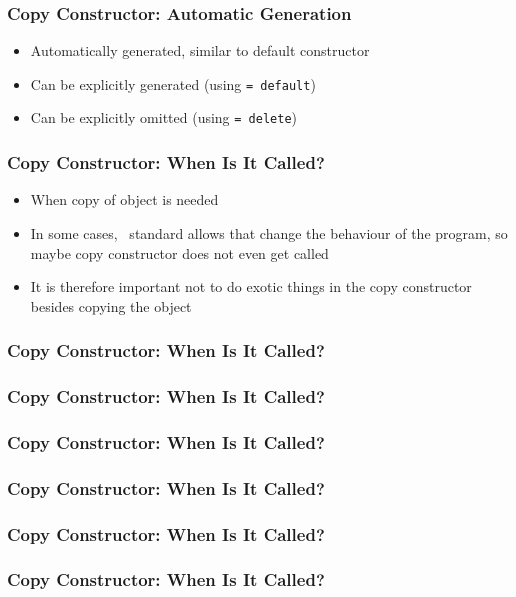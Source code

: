 \documentclass{../ucll-slides}
\begin{document}
\begin{frame}
  \frametitle{Copy Constructor: Automatic Generation}
  \begin{itemize}
    \item Automatically generated, similar  to default constructor
    \item Can be explicitly generated (using {\tt = default})
    \item Can be explicitly omitted (using {\tt = delete})
  \end{itemize}
\end{frame}

\begin{frame}
  \frametitle{Copy Constructor: When Is It Called?}
  \begin{itemize}
    \item When copy of object is needed
    \item In some cases, \cpp\ standard allows 
          that change the behaviour of the program, so maybe copy constructor does not even get called
    \item It is therefore important not to do exotic things in the copy constructor besides copying the object
  \end{itemize}
\end{frame}

\begin{frame}
  \frametitle{Copy Constructor: When Is It Called?}
\end{frame}

\begin{frame}
  \frametitle{Copy Constructor: When Is It Called?}
\end{frame}

\begin{frame}
  \frametitle{Copy Constructor: When Is It Called?}
\end{frame}

\begin{frame}
  \frametitle{Copy Constructor: When Is It Called?}
\end{frame}

\begin{frame}
  \frametitle{Copy Constructor: When Is It Called?}
\end{frame}

\begin{frame}
  \frametitle{Copy Constructor: When Is It Called?}
\end{frame}


\end{document}
